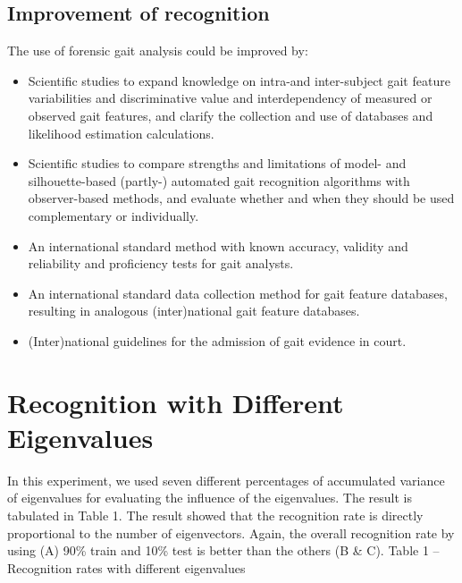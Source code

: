 \documentclass{style1}
\begin{document}
\subsection{Improvement of recognition}
The use of forensic gait analysis could be improved by: 
\begin{itemize}
\item Scientific studies to expand knowledge on intra-and inter-subject gait feature variabilities and discriminative value and interdependency of measured or observed gait features, and clarify the collection and use of databases and likelihood estimation calculations.  
\item Scientific studies to compare strengths and limitations of model- and silhouette-based (partly-) automated gait recognition algorithms with observer-based methods, and evaluate whether and when they should be used complementary or individually.  
\item An international standard method with known accuracy, validity and reliability and proficiency tests for gait analysts.  
\item An international standard data collection method for gait feature databases, resulting in analogous (inter)national gait feature databases.  
\item (Inter)national guidelines for the admission of gait evidence in court.  
\end{itemize}
\section{Recognition with Different Eigenvalues}
In this experiment, we used seven different percentages of accumulated variance of eigenvalues for evaluating the influence of the eigenvalues. The result is tabulated in Table 1. The result showed that the recognition rate is directly proportional to the number of eigenvectors. Again, the overall recognition rate by using (A) 90\% train and 10\% test is better than the others (B \& C).
\newpage
Table 1 –  Recognition rates with different eigenvalues
\end{document}
